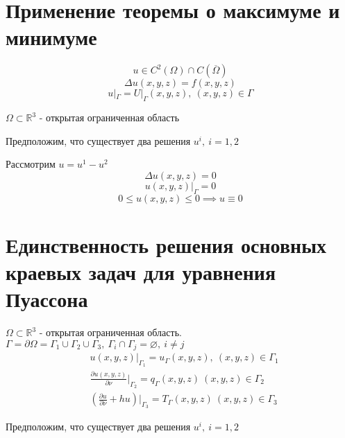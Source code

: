 \documentclass[a4paper]{article}
\theoremstyle{definition}
\theoremstyle{remark}
\begin{document}
\section*{Применение теоремы о максимуме и минимуме}
\[
u \in C^2(\Omega) \cap C(\overline{\Omega})
\]
\begin{equation}
    \Delta u(x,y,z) = f(x,y,z)
\end{equation}
\begin{equation}
    u |_{\Gamma} = U|_{\Gamma}(x,y,z), \ (x,y,z) \in \Gamma
\end{equation}

$ \Omega \subset \mathbb{R}^3 $ - открытая ограниченная область

Предположим, что существует два решения $ u^i, \ i = 1,2 $ 

Рассмотрим $ u = u^1 - u^2 $ 
\[
    \Delta u(x,y,z) = 0
\]
\[
    u(x,y,z)|_{\Gamma} = 0
\]
\[
    0 \leq u(x,y,z) \leq 0 \implies u \equiv 0
\]

\section*{Единственность решения основных краевых задач для уравнения Пуассона}

$ \Omega \subset \mathbb{R}^3 $ - открытая ограниченная область. 
$ \Gamma = \partial \Omega = \Gamma_1 \cup \Gamma_2 \cup \Gamma_3, \ 
\Gamma_i \cap \Gamma_j = \varnothing, \ i \neq j$ 
\begin{subequations}
    \begin{align}
            &u(x,y,z) |_{\Gamma_1} = u_{\Gamma}(x,y,z), \ (x,y,z) \in \Gamma_1\\
            &\frac{\partial u(x,y,z)}{\partial \nu} \bigg|_{\Gamma_2} = q_{\Gamma}(x,y,z)
            \ (x,y,z) \in \Gamma_2\\
            &\left( \frac{\partial u}{\partial \nu} + hu \right)\bigg|_{\Gamma_3} = T_{\Gamma}(x,y,z)
            \ (x,y,z) \in \Gamma_3
    \end{align}
\end{subequations}

Предположим, что существует два решения $ u^i, \ i = 1,2 $ 
\end{document}
